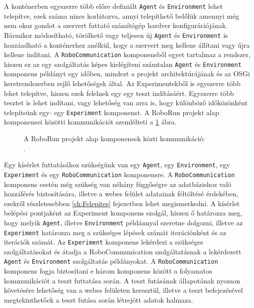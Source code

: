 	 A konténerben egyszerre több előre definiált \texttt{Agent} és \texttt{Environment} lehet telepítve, ezek száma nincs korlátozva, annyi telepíthető belőlük amennyi még nem okoz gondot a szervert futtató számítógép hardver konfigurációjának. Bármikor módosítható, törölhető vagy teljesen új \texttt{Agent} és \texttt{Environment} is hozzáadható a konténerhez anélkül, hogy a szervert meg kellene állítani vagy újra kellene indítani. A \texttt{RoboCommunication} komponensből egyet tartalmaz a rendszer, hiszen ez az egy szolgáltatás képes kielégíteni számtalan \texttt{Agent} és \texttt{Environment} komponens példányt egy időben, mindezt a projekt architektúrájának és az OSGi keretrendszerben rejlő lehetőségek által. Az Experimentekből is egyszerre több lehet telepítve, hiszen ezek felelnek egy egy teszt indításáért. Egyszerre több tesztet is lehet indítani, vagy lehetőség van arra is, hogy különböző időközönként telepítsünk egy- egy \texttt{Experiment} komponenst. A RoboRun projekt alap komponensei közötti kommunikációt szemlélteti a \ref{fig:OsgiAlap} ábra.

\begin{figure}[h!]
  \centering
  \caption[RoboRun alap komponensek]%
  {A RoboRun projekt alap komponensek közti kommunikáció:\\
  {\white .}\hfill\url{}}
  \label{fig:OsgiAlap}
\end{figure}


Egy kísérlet futtatásához szükségünk van egy \texttt{Agent}, egy \texttt{Environment}, egy \texttt{Experiment} és egy \texttt{RoboCommunication} komponensre. A \texttt{RoboCommunication} komponens esetén még szükség van néhány függőségre az adatbázishoz való hozzáférés biztosítására, illetve a webes felület adatainak féltöltésé érdekében, ezekről részletesebben \ref{ch:Felepites} fejezetben lehet megismerkedni. A kísérlet belépési pontjaként az Experiment komponens szolgál, hiszen ő határozza meg, hogy melyik \texttt{Agent}, illetve \texttt{Environment} példánnyal szeretne dolgozni, illetve az \texttt{Experiment} határozza meg a szükséges lépések számát iterációnként és az iterációk számát. Az \texttt{Experiment} komponens lekérdezi a szükséges szolgáltatásokat és átadja a RoboCommunication szolgáltatásnak a lekérdezett \texttt{Agent} és \texttt{Environment} szolgáltatás példányokat. A \texttt{RoboCommunication} komponens fogja biztosítani e három komponens között a folyamatos kommunikációt a teszt futtatása során. A teszt futásának állapotának nyomon követésére lehetőség van a webes felületen keresztül, illetve a teszt befejezésével megtekinthetőek a teszt futása során létrejött adatok halmaza.


